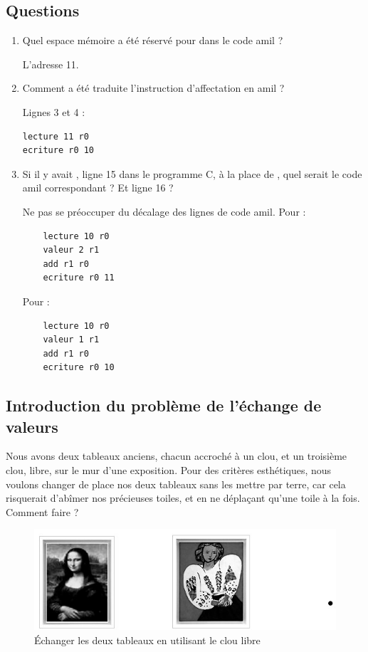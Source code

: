 \subsection{Questions}
\begin{enumerate}
\item Quel espace mémoire a été réservé pour  dans le code amil ?
  \begin{correction}
L'adresse 11.    
  \end{correction}
\item Comment a été traduite l'instruction d'affectation  en amil ?
  \begin{correction}
Lignes 3 et 4 :
\begin{verbatim}
lecture 11 r0
ecriture r0 10    
\end{verbatim}
  \end{correction}
\item Si il y avait , ligne 15 dans le programme C, à la
  place de , quel serait le code amil correspondant ? Et  ligne 16 ?
  \begin{correction}
Ne pas se préoccuper du décalage des lignes de code amil. Pour  :
\begin{verbatim}
    lecture 10 r0
    valeur 2 r1
    add r1 r0
    ecriture r0 11
\end{verbatim}
Pour  :
\begin{verbatim}
    lecture 10 r0
    valeur 1 r1
    add r1 r0
    ecriture r0 10
\end{verbatim}

  \end{correction}
\end{enumerate}

\subsection{Introduction du problème de l'échange de valeurs}

Nous avons deux tableaux anciens, chacun accroché à un clou, et un
troisième clou, libre, sur le mur d'une exposition.
Pour des critères esthétiques, nous voulons changer de place nos deux
tableaux sans les mettre par terre, car cela risquerait d'abîmer nos
précieuses toiles, et en ne déplaçant qu'une toile à la fois. Comment faire ? 
\begin{figure}[h!]
    \begin{center}
        \includegraphics[scale=.6]{tableaux.jpg}
    \end{center}
    \caption{Échanger les deux tableaux en utilisant le clou libre}
    \label{fig:ex_onto}
\end{figure}

